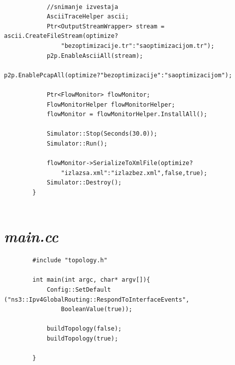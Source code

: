 \documentclass[a4paper, 12pt, projekat]{etf}
\begin{document}
\begin{verbatim}
			
			//snimanje izvestaja
			AsciiTraceHelper ascii;
			Ptr<OutputStreamWrapper> stream = ascii.CreateFileStream(optimize?
			    "bezoptimizacije.tr":"saoptimizacijom.tr");
			p2p.EnableAsciiAll(stream);
			p2p.EnablePcapAll(optimize?"bezoptimizacije":"saoptimizacijom");
			
			Ptr<FlowMonitor> flowMonitor;
			FlowMonitorHelper flowMonitorHelper;
			flowMonitor = flowMonitorHelper.InstallAll();
			
			Simulator::Stop(Seconds(30.0));
			Simulator::Run();
			
			flowMonitor->SerializeToXmlFile(optimize?
			    "izlazsa.xml":"izlazbez.xml",false,true);
			Simulator::Destroy();
		}
	
	\end{verbatim}
	\section*{\emph{main.cc}}
	\begin{verbatim}
		#include "topology.h"
		
		int main(int argc, char* argv[]){
			Config::SetDefault ("ns3::Ipv4GlobalRouting::RespondToInterfaceEvents", 
			    BooleanValue(true));
			
			buildTopology(false);
			buildTopology(true);
			
		}
	\end{verbatim}
\end{document}
